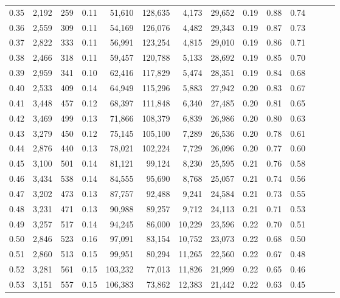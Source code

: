 \begin{tabular}{rrrrrrrrrrrrrr}
0.35 &  2,192 &  259 &  0.11 &   51,610 &  128,635 &   4,173 &  29,652 &  0.19 &  0.88 &      0.74 \\
0.36 &  2,559 &  309 &  0.11 &   54,169 &  126,076 &   4,482 &  29,343 &  0.19 &  0.87 &      0.73 \\
0.37 &  2,822 &  333 &  0.11 &   56,991 &  123,254 &   4,815 &  29,010 &  0.19 &  0.86 &      0.71 \\
0.38 &  2,466 &  318 &  0.11 &   59,457 &  120,788 &   5,133 &  28,692 &  0.19 &  0.85 &      0.70 \\
0.39 &  2,959 &  341 &  0.10 &   62,416 &  117,829 &   5,474 &  28,351 &  0.19 &  0.84 &      0.68 \\
0.40 &  2,533 &  409 &  0.14 &   64,949 &  115,296 &   5,883 &  27,942 &  0.20 &  0.83 &      0.67 \\
0.41 &  3,448 &  457 &  0.12 &   68,397 &  111,848 &   6,340 &  27,485 &  0.20 &  0.81 &      0.65 \\
0.42 &  3,469 &  499 &  0.13 &   71,866 &  108,379 &   6,839 &  26,986 &  0.20 &  0.80 &      0.63 \\
0.43 &  3,279 &  450 &  0.12 &   75,145 &  105,100 &   7,289 &  26,536 &  0.20 &  0.78 &      0.61 \\
0.44 &  2,876 &  440 &  0.13 &   78,021 &  102,224 &   7,729 &  26,096 &  0.20 &  0.77 &      0.60 \\
0.45 &  3,100 &  501 &  0.14 &   81,121 &   99,124 &   8,230 &  25,595 &  0.21 &  0.76 &      0.58 \\
0.46 &  3,434 &  538 &  0.14 &   84,555 &   95,690 &   8,768 &  25,057 &  0.21 &  0.74 &      0.56 \\
0.47 &  3,202 &  473 &  0.13 &   87,757 &   92,488 &   9,241 &  24,584 &  0.21 &  0.73 &      0.55 \\
0.48 &  3,231 &  471 &  0.13 &   90,988 &   89,257 &   9,712 &  24,113 &  0.21 &  0.71 &      0.53 \\
0.49 &  3,257 &  517 &  0.14 &   94,245 &   86,000 &  10,229 &  23,596 &  0.22 &  0.70 &      0.51 \\
0.50 &  2,846 &  523 &  0.16 &   97,091 &   83,154 &  10,752 &  23,073 &  0.22 &  0.68 &      0.50 \\
0.51 &  2,860 &  513 &  0.15 &   99,951 &   80,294 &  11,265 &  22,560 &  0.22 &  0.67 &      0.48 \\
0.52 &  3,281 &  561 &  0.15 &  103,232 &   77,013 &  11,826 &  21,999 &  0.22 &  0.65 &      0.46 \\
0.53 &  3,151 &  557 &  0.15 &  106,383 &   73,862 &  12,383 &  21,442 &  0.22 &  0.63 &      0.45 \\

\end{tabular}
